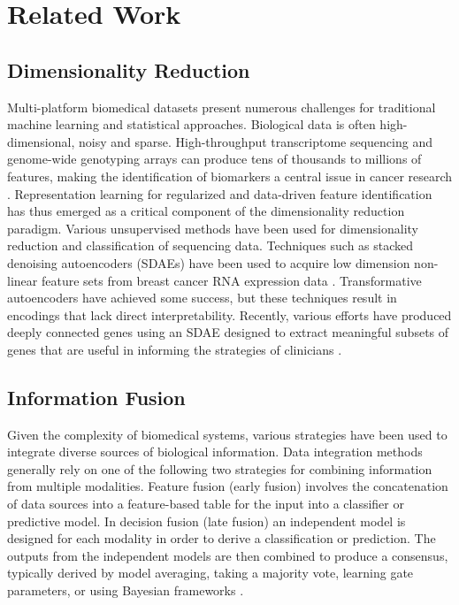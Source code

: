 \chapter{Related Work} \label{chap:relatedwork}

\section{Dimensionality Reduction}

Multi-platform biomedical datasets present numerous challenges for traditional machine learning and statistical approaches. Biological data is often high-dimensional, noisy and sparse. High-throughput transcriptome sequencing and genome-wide genotyping arrays can produce tens of thousands to millions of features, making the identification of biomarkers a central issue in cancer research \cite{vaske2010inference}. Representation learning for regularized and data-driven feature identification has thus emerged as a critical component of the dimensionality reduction paradigm. Various unsupervised methods have been used for dimensionality reduction and classification of sequencing data. Techniques such as stacked denoising autoencoders (SDAEs) have been used to acquire low dimension non-linear feature sets from breast cancer RNA expression data \cite{teixeira2017learning}. Transformative autoencoders have achieved some success, but these techniques result in encodings that lack direct interpretability. Recently, various efforts have produced deeply connected genes using an SDAE designed to extract meaningful subsets of genes that are useful in informing the strategies of clinicians \cite{danaee2017deep,teixeira2017learning}.

\section{Information Fusion}

Given the complexity of biomedical systems, various strategies have been used to integrate diverse sources of biological information. Data integration methods generally rely on one of the following two strategies for combining information from multiple modalities. Feature fusion (early fusion) involves the concatenation of data sources into a feature-based table for the input into a classifier or predictive model. In decision fusion (late fusion) an independent model is designed for each modality in order to derive a classification or prediction. The outputs from the independent models are then combined to produce a consensus, typically derived by model averaging, taking a majority vote, learning gate parameters, or using Bayesian frameworks \cite{yang2010review}.

